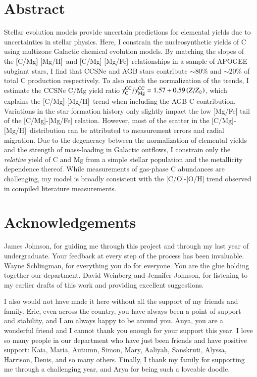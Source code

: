 \documentclass[12pt,oneside]{report}
\newcommand{\caah}{[C/Mg]-[Mg/H]}
\newcommand{\caafe}{[C/Mg]-[Mg/Fe]}
\newcommand{\Ycc}{\ensuremath{y_{\rm C}^{\rm CC}}}
\newcommand{\Yoc}{\ensuremath{y_{\rm Mg}^{\rm CC}}}
\newcommand{\about}[1]{${\sim} #1$}
\begin{document}
\chapter*{Abstract}
Stellar evolution models provide uncertain predictions for elemental yields due to uncertainties in stellar physics.
Here, I constrain the nucleosynthetic yields of C using multizone Galactic chemical evolution models.
By matching the slopes of the \caah\ and \caafe\ relationships in a sample of APOGEE subgiant stars, I find that CCSNe and AGB stars contribute \about{80\%} and \about{20\%} of total C production respectively.
% 
To also match the normalization of the trends, I estimate the CCSNe C/Mg yield ratio $\Ycc/\Yoc = 1.57 + 0.59 \left(Z/Z_\odot\right)$, which explains the \caah\ trend when including the AGB C contribution.
%
Variations in the star formation history only slightly impact the low [Mg/Fe] tail of the [C/Mg]-[Mg/Fe] relation. However, most of the scatter in the \caah\ distribution can be attributed to measurement errors and radial migration. 
% 
Due to the degeneracy between the normalization of elemental yields and the strength of mass-loading in Galactic outflows, I constrain only the {\it relative} yield of C and Mg from a simple stellar population and the metallicity dependence thereof. While measurements of gas-phase C abundances are challenging, my model is broadly consistent with the [C/O]-[O/H] trend observed in compiled literature measurements.


\chapter*{Acknowledgements}

James Johnson, for guiding me through this project and through my last year of undergraduate. Your feedback at every step of the process has been invaluable.
Wayne Schlingman, for everything you do for everyone. You are the glue holding together our department. David Weinberg and Jennifer Johnson, for listening to my earlier drafts of this work and providing excellent suggestions.

I also would not have made it here without all the support of my friends and family. Eric, even across the country, you have always been a point of support and stability, and I am always happy to be around you. Anya, you are a wonderful friend and I cannot thank you enough for your support this year. 
I love so many people in our department who have just been friends and have positive support: Kaia, Maria, Autumn, Simon, Mary, Aaliyah, Sanskruti, Alyssa, Harrison, Denis, and so many others. 
Finally, I thank my family for supporting me through a challenging year, and Arya for being such a loveable doodle.
\end{document}
